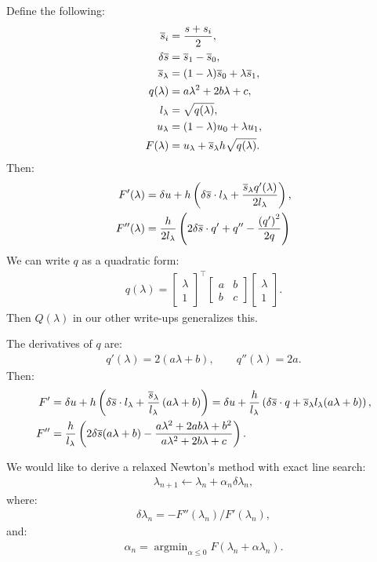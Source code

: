 \documentclass{article}
\begin{document}
Define the following:
\begin{align*}
  \overline{s}_i &= \frac{s + s_i}{2}, \\
  \delta \overline{s} &= \overline{s}_1 - \overline{s}_0, \\
  \overline{s}_\lambda &= (1 - \lambda)\overline{s}_0 + \lambda \overline{s}_1, \\
  q(\lambda) &= a\lambda^2 + 2b\lambda + c, \\
  l_\lambda &= \sqrt{q(\lambda)}, \\
  u_\lambda &= (1 - \lambda)u_0 + \lambda u_1, \\
  F(\lambda) &= u_\lambda + \overline{s}_\lambda h \sqrt{q(\lambda)}.
\end{align*}
Then:
\begin{align*}
  F'(\lambda) &= \delta u + h\left(\delta\overline{s}\cdot{}l_\lambda + \frac{\overline{s}_\lambda q'(\lambda)}{2 l_\lambda}\right), \\
  F''(\lambda) &= \frac{h}{2 l_\lambda} \left(2 \delta\overline{s}\cdot{}q' + q'' - \frac{{(q')}^2}{2 q}\right)
\end{align*}
We can write $q$ as a quadratic form:
\begin{align*}
  q(\lambda) = \begin{bmatrix} \lambda \\ 1 \end{bmatrix}^\top \begin{bmatrix} a & b \\ b & c \end{bmatrix} \begin{bmatrix} \lambda \\ 1 \end{bmatrix}.
\end{align*}
Then $Q(\lambda)$ in our other write-ups generalizes this.

The derivatives of $q$ are:
\begin{align*}
  q'(\lambda) = 2(a\lambda + b), \qquad q''(\lambda) = 2a.
\end{align*}
Then:
\begin{align*}
  F' &= \delta u + h\left(\delta\overline{s}\cdot{}l_\lambda + \frac{\overline{s}_\lambda}{l_\lambda} \left(a \lambda + b\right)\right) = \delta u + \frac{h}{l_\lambda} \left(\delta\overline{s}\cdot{}q + \overline{s}_\lambda l_\lambda (a \lambda + b)\right), \\
  F'' &= \frac{h}{l_\lambda} \left(2 \delta\overline{s} (a \lambda + b) - \frac{a \lambda^2 + 2ab \lambda + b^2}{a\lambda^2 + 2b \lambda + c}\right).
\end{align*}

We would like to derive a relaxed Newton's method with exact line
search:
\begin{align*}
  \lambda_{n+1} \gets \lambda_n + \alpha_n \delta \lambda_n,
\end{align*}
where:
\begin{align*}
  \delta \lambda_n = -F''(\lambda_n)/F'(\lambda_n),
\end{align*}
and:
\begin{align*}
  \alpha_n = \operatorname{argmin}_{\alpha \leq 0} F(\lambda_n + \alpha \lambda_n).
\end{align*}
\end{document}
